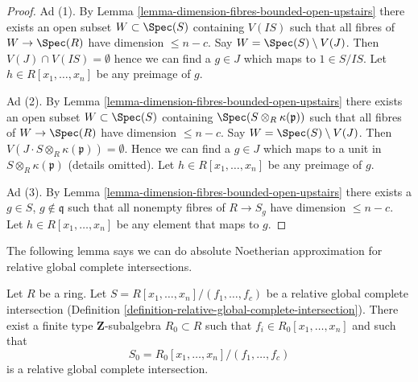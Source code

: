 \begin{proof}
Ad (1). By Lemma \ref{lemma-dimension-fibres-bounded-open-upstairs}
there exists an open subset $W \subset \Spec(S)$ containing $V(IS)$
such that all fibres of $W \to \Spec(R)$ have dimension $\leq n - c$.
Say $W = \Spec(S) \setminus V(J)$. Then $V(J) \cap V(IS) = \emptyset$
hence we can find a $g \in J$ which maps to $1 \in S/IS$.
Let $h \in R[x_1, \ldots, x_n]$ be any preimage of $g$.

\medskip\noindent
Ad (2). By Lemma \ref{lemma-dimension-fibres-bounded-open-upstairs}
there exists an open subset $W \subset \Spec(S)$ containing
$\Spec(S \otimes_R \kappa(\mathfrak p))$
such that all fibres of $W \to \Spec(R)$ have dimension $\leq n - c$.
Say $W = \Spec(S) \setminus V(J)$. Then
$V(J \cdot S \otimes_R \kappa(\mathfrak p)) = \emptyset$.
Hence we can find a $g \in J$ which maps to a unit in
$S \otimes_R \kappa(\mathfrak p)$ (details omitted).
Let $h \in R[x_1, \ldots, x_n]$ be any preimage of $g$.

\medskip\noindent
Ad (3). By Lemma \ref{lemma-dimension-fibres-bounded-open-upstairs}
there exists a $g \in S$, $g \not \in \mathfrak q$
such that all nonempty fibres of $R \to S_g$
have dimension $\leq n - c$. Let $h \in R[x_1, \ldots, x_n]$
be any element that maps to $g$.
\end{proof}

\noindent
The following lemma says we can do absolute Noetherian
approximation for relative global complete intersections.

\begin{lemma}
\label{lemma-relative-global-complete-intersection-Noetherian}
Let $R$ be a ring. Let $S = R[x_1, \ldots, x_n]/(f_1, \ldots, f_c)$
be a relative global complete intersection
(Definition \ref{definition-relative-global-complete-intersection}).
There exist a finite type $\mathbf{Z}$-subalgebra $R_0 \subset R$
such that $f_i \in R_0[x_1, \ldots, x_n]$ and such that
$$
S_0 = R_0[x_1, \ldots, x_n]/(f_1, \ldots, f_c)
$$
is a relative global complete intersection.
\end{lemma}

